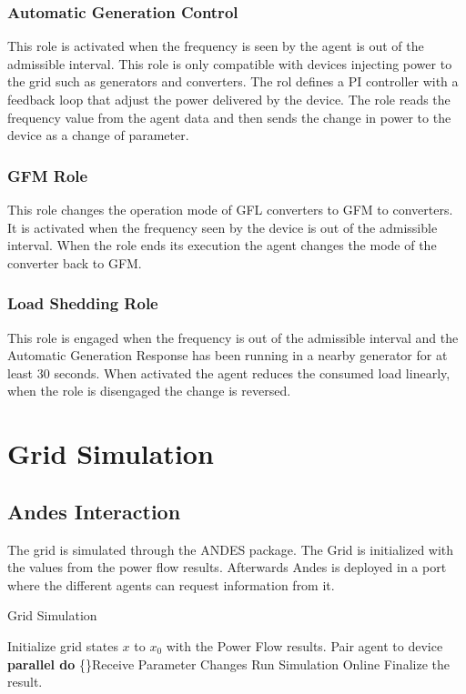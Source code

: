 \documentclass{article}
\newcommand{\DoParallel}[1]{\textbf{parallel do} \{#1\}}
\begin{document}
\subsubsection*{Automatic Generation Control}

This role is activated when the frequency is seen by the agent is out of the admissible interval. This role is only compatible with devices injecting power to the grid such as generators and converters. The rol defines a PI controller with a feedback loop that adjust the power delivered by the device. The role reads the frequency value from the agent data and then sends the change in power to the device as a change of parameter.

\subsubsection*{GFM Role}

This role changes the operation mode of GFL converters to GFM to converters. It is activated when the frequency seen by the device is out of the admissible interval. When the role ends its execution the agent changes the mode of the converter back to GFM.

\subsubsection*{Load Shedding Role}

This role is engaged when the frequency is out of the admissible interval and the Automatic Generation Response has been running in a nearby generator for at least 30 seconds. When activated the agent reduces the consumed load linearly, when the role is disengaged the change is reversed.


\section{Grid Simulation}

\subsection{Andes Interaction}

The grid is simulated through the ANDES package. The Grid is initialized with the values from the power flow results. Afterwards Andes is deployed in a port where the different agents can request information from it. 

\begin{algorithm}
    \caption{Grid Simulation}
    \label{algo:COLMENAANDES}
    \begin{algorithmic}[1]
        \State Initialize grid states $x$ to $x_0$ with the Power Flow results.
                    \State Pair agent to device
                \EndIf
            \EndFor
        \EndFor
            \DoParallel
                \State Receive Parameter Changes
                \State Run Simulation Online
        \EndWhile
        \State Finalize the result.
    \end{algorithmic}
\end{algorithm}
\end{document}

